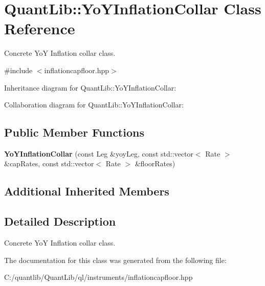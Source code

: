 \section{Quant\+Lib\+:\+:Yo\+Y\+Inflation\+Collar Class Reference}
\label{class_quant_lib_1_1_yo_y_inflation_collar}


Concrete YoY Inflation collar class.  




{\ttfamily \#include $<$inflationcapfloor.\+hpp$>$}



Inheritance diagram for Quant\+Lib\+:\+:Yo\+Y\+Inflation\+Collar\+:


Collaboration diagram for Quant\+Lib\+:\+:Yo\+Y\+Inflation\+Collar\+:
\subsection*{Public Member Functions}
\begin{DoxyCompactItemize}
\item 
{\bfseries Yo\+Y\+Inflation\+Collar} (const Leg \&yoy\+Leg, const std\+::vector$<$ Rate $>$ \&cap\+Rates, const std\+::vector$<$ Rate $>$ \&floor\+Rates)\label{class_quant_lib_1_1_yo_y_inflation_collar_ae23a96a15f371814c3815b7ea952b2d8}

\end{DoxyCompactItemize}
\subsection*{Additional Inherited Members}


\subsection{Detailed Description}
Concrete YoY Inflation collar class. 



The documentation for this class was generated from the following file\+:\begin{DoxyCompactItemize}
\item 
C\+:/quantlib/\+Quant\+Lib/ql/instruments/inflationcapfloor.\+hpp\end{DoxyCompactItemize}
